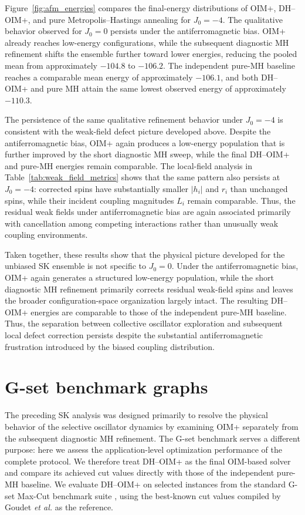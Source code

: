 \documentclass[
reprint,
amsmath,amssymb,
aps,
pre,
floatfix,
]{revtex4-2}
\begin{document}
Figure~\ref{fig:afm_energies} compares the final-energy distributions of
OIM+, DH--OIM+, and pure Metropolis--Hastings annealing for $J_0=-4$.
The qualitative behavior observed for $J_0=0$ persists under the
antiferromagnetic bias. OIM+ already reaches low-energy configurations,
while the subsequent diagnostic MH refinement shifts the ensemble further
toward lower energies, reducing the pooled mean from approximately $-104.8$
to $-106.2$. The independent pure-MH baseline reaches a comparable mean
energy of approximately $-106.1$, and both DH--OIM+ and pure MH attain the
same lowest observed energy of approximately $-110.3$.

The persistence of the same qualitative refinement behavior under
$J_0=-4$ is consistent with the weak-field defect picture developed above.
Despite the antiferromagnetic bias, OIM+ again produces a low-energy
population that is further improved by the short diagnostic MH sweep,
while the final DH--OIM+ and pure-MH energies remain comparable.
The local-field analysis in Table~\ref{tab:weak_field_metrics} shows that
the same pattern also persists at $J_0=-4$: corrected spins have
substantially smaller $|h_i|$ and $r_i$ than unchanged spins, while their
incident coupling magnitudes $L_i$ remain comparable. Thus, the residual
weak fields under antiferromagnetic bias are again associated primarily
with cancellation among competing interactions rather than unusually weak
coupling environments.

Taken together, these results show that the physical picture developed for
the unbiased SK ensemble is not specific to $J_0=0$. Under the
antiferromagnetic bias, OIM+ again generates a structured low-energy
population, while the short diagnostic MH refinement primarily corrects
residual weak-field spins and leaves the broader configuration-space
organization largely intact. The resulting DH--OIM+ energies are comparable
to those of the independent pure-MH baseline.  Thus, the separation between collective oscillator exploration and
subsequent local defect correction persists despite the substantial
antiferromagnetic frustration introduced by the biased coupling
distribution.

\section{G-set benchmark graphs}
\label{sec:benchmarks}

The preceding SK analysis was designed primarily to resolve the physical
behavior of the selective oscillator dynamics by examining OIM+ separately
from the subsequent diagnostic MH refinement. The G-set benchmark serves a
different purpose: here we assess the application-level optimization
performance of the complete protocol. We therefore treat DH--OIM+ as the
final OIM-based solver and compare its achieved cut values directly with
those of the independent pure-MH baseline. We evaluate DH--OIM+ on selected
instances from the standard G-set Max-Cut benchmark suite
\cite{Helmberg2000}, using the best-known cut values compiled by Goudet
\emph{et al.} \cite{Goudet2024} as the reference.
\end{document}
